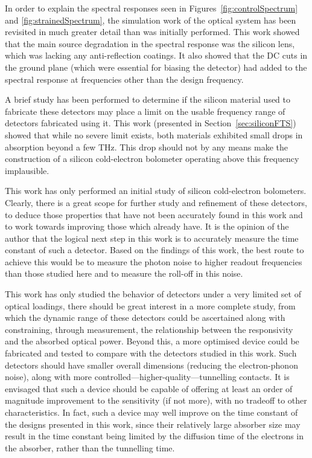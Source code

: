 \par 
In order to explain the spectral responses seen in Figures~\ref{fig:controlSpectrum} and \ref{fig:strainedSpectrum}, the simulation work of the optical system has been revisited in much greater detail than was initially performed. This work showed that the main source degradation in the spectral response was the silicon lens, which was lacking any anti-reflection coatings. It also showed that the DC cuts in the ground plane (which were essential for biasing the detector) had added to the spectral response at frequencies other than the design frequency.
\par 
A brief study has been performed to determine if the silicon material used to fabricate these detectors may place a limit on the usable frequency range of detectors fabricated using it. This work (presented in Section~\ref{sec:siliconFTS}) showed that while no severe limit exists, both materials exhibited small drops in absorption beyond a few THz. This drop should not by any means make the construction of a silicon cold-electron bolometer operating above this frequency implausible.
\par 
This work has only performed an initial study of silicon cold-electron bolometers. Clearly, there is a great scope for further study and refinement of these detectors, to deduce those properties that have not been accurately found in this work and to work towards improving those which already have. It is the opinion of the author that the logical next step in this work is to accurately measure the time constant of such a detector. Based on the findings of this work, the best route to achieve this would be to measure the photon noise to higher readout frequencies than those studied here and to measure the roll-off in this noise.
\par 
This work has only studied the behavior of detectors under a very limited set of optical loadings, there should be great interest in a more complete study, from which the dynamic range of these detectors could be ascertained along with constraining, through measurement, the relationship between the responsivity and the absorbed optical power. Beyond this, a more optimised device could be fabricated and tested to compare with the detectors studied in this work. Such detectors should have smaller overall dimensions (reducing the electron-phonon noise), along with more controlled---higher-quality---tunnelling contacts. It is envisaged that such a device should be capable of offering at least an order of magnitude improvement to the sensitivity (if not more), with no tradeoff to other characteristics. In fact, such a device may well improve on the time constant of the designs presented in this work, since their relatively large absorber size may result in the time constant being limited by the diffusion time of the electrons in the absorber, rather than the tunnelling time.
